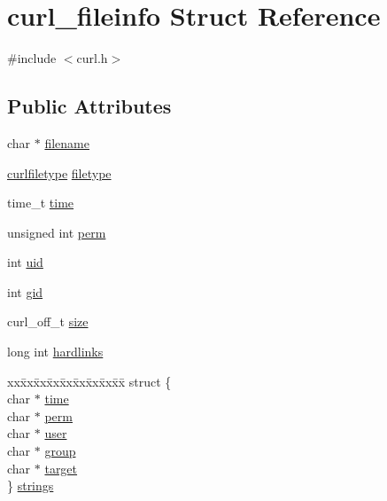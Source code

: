 \hypertarget{structcurl__fileinfo}{}\section{curl\+\_\+fileinfo Struct Reference}
\label{structcurl__fileinfo}


{\ttfamily \#include $<$curl.\+h$>$}

\subsection*{Public Attributes}
\begin{DoxyCompactItemize}
\item 
char $\ast$ \hyperlink{structcurl__fileinfo_ae42985a10c5ac94b2ac09c5e75c05e40}{filename}
\item 
\hyperlink{curl_8h_a9780ca29d2faed151148e197d1d1e94f}{curlfiletype} \hyperlink{structcurl__fileinfo_a69b09df292a2f8a749ffd24f172b0bde}{filetype}
\item 
time\+\_\+t \hyperlink{structcurl__fileinfo_a5136db1360519440e97f481a9a05da0f}{time}
\item 
unsigned int \hyperlink{structcurl__fileinfo_a48e688d2b2feee03da8ae21924f3b97b}{perm}
\item 
int \hyperlink{structcurl__fileinfo_aa6fed17f82b0137397ebcb7b35c4c100}{uid}
\item 
int \hyperlink{structcurl__fileinfo_ab4833a1bcdb0c29421f7c53c30c3fc1e}{gid}
\item 
curl\+\_\+off\+\_\+t \hyperlink{structcurl__fileinfo_a23e38e1ca497cb7a140d9aff92f33fc0}{size}
\item 
long int \hyperlink{structcurl__fileinfo_ab77d9241666cf7c216b8d12e4b55efef}{hardlinks}
\item 
\begin{tabbing}
xx\=xx\=xx\=xx\=xx\=xx\=xx\=xx\=xx\=\kill
struct \{\\
\>char $\ast$ \hyperlink{structcurl__fileinfo_ab25d86f3b4f3c89fb924c6af136b350c}{time}\\
\>char $\ast$ \hyperlink{structcurl__fileinfo_a356964c606c7a4167cc468bffb2dcec9}{perm}\\
\>char $\ast$ \hyperlink{structcurl__fileinfo_af65d2a4ca6d383fcba5db89f2bf124e3}{user}\\
\>char $\ast$ \hyperlink{structcurl__fileinfo_a901b33485167a493e8401da47cad3bb7}{group}\\
\>char $\ast$ \hyperlink{structcurl__fileinfo_a68e8fc68544920dc452306a79bea8907}{target}\\
\} \hyperlink{structcurl__fileinfo_a45518549e5fced720c41dde3fba925ee}{strings}\\


\end{tabbing}
\end{DoxyCompactItemize}
